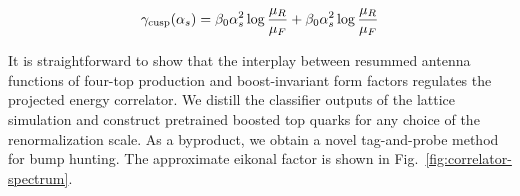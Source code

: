 \begin{equation}
  \gamma_{\rm cusp}(\alpha_s) = \beta_0 \alpha_s^2 \log\frac{\mu_R}{\mu_F} + \beta_0 \alpha_s^2 \log\frac{\mu_R}{\mu_F}
  \label{eq:3}
\end{equation}

It is straightforward to show that the interplay between resummed
antenna functions of four-top production and boost-invariant form
factors regulates the projected energy correlator. We distill the
classifier outputs of the lattice simulation and construct pretrained
boosted top quarks for any choice of the renormalization scale. As a
byproduct, we obtain a novel tag-and-probe method for bump hunting. The
approximate eikonal factor is shown in
Fig.~\ref{fig:correlator-spectrum}.

